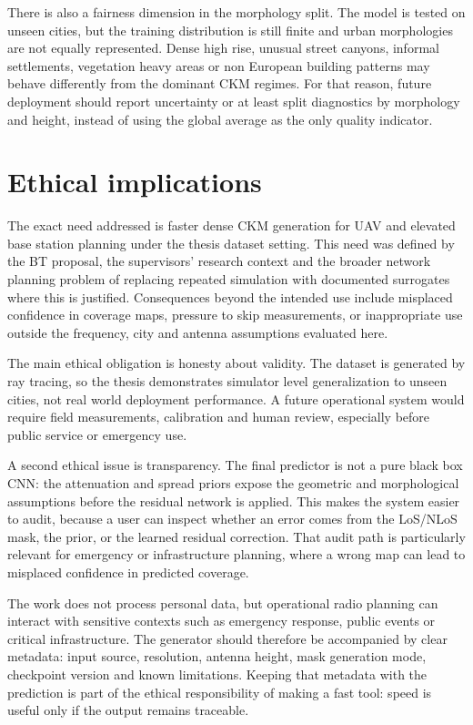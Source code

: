 There is also a fairness dimension in the morphology split. The model is tested
on unseen cities, but the training distribution is still finite and urban
morphologies are not equally represented. Dense high rise, unusual street
canyons, informal settlements, vegetation heavy areas or non European building
patterns may behave differently from the dominant CKM regimes. For that reason,
future deployment should report uncertainty or at least split diagnostics by
morphology and height, instead of using the global average as the only quality
indicator.

\section{Ethical implications}

The exact need addressed is faster dense CKM generation for UAV and elevated base
station planning under the thesis dataset setting. This need was defined by the
BT proposal, the supervisors' research context and the broader network planning
problem of replacing repeated simulation with documented surrogates where this
is justified. Consequences beyond the intended use include misplaced confidence
in coverage maps, pressure to skip measurements, or inappropriate use outside the
frequency, city and antenna assumptions evaluated here.

The main ethical obligation is honesty about validity. The dataset is generated
by ray tracing, so the thesis demonstrates simulator level generalization to
unseen cities, not real world deployment performance. A future operational
system would require field measurements, calibration and human review,
especially before public service or emergency use.

A second ethical issue is transparency. The final predictor is not a pure
black box CNN: the attenuation and spread priors expose the geometric and
morphological assumptions before the residual network is applied. This makes the
system easier to audit, because a user can inspect whether an error comes from
the LoS/NLoS mask, the prior, or the learned residual correction. That audit
path is particularly relevant for emergency or infrastructure planning, where a
wrong map can lead to misplaced confidence in predicted coverage.

The work does not process personal data, but operational radio planning can
interact with sensitive contexts such as emergency response, public events or
critical infrastructure. The generator should therefore be accompanied by clear
metadata: input source, resolution, antenna height, mask generation mode,
checkpoint version and known limitations. Keeping that metadata with the
prediction is part of the ethical responsibility of making a fast tool: speed is
useful only if the output remains traceable.

